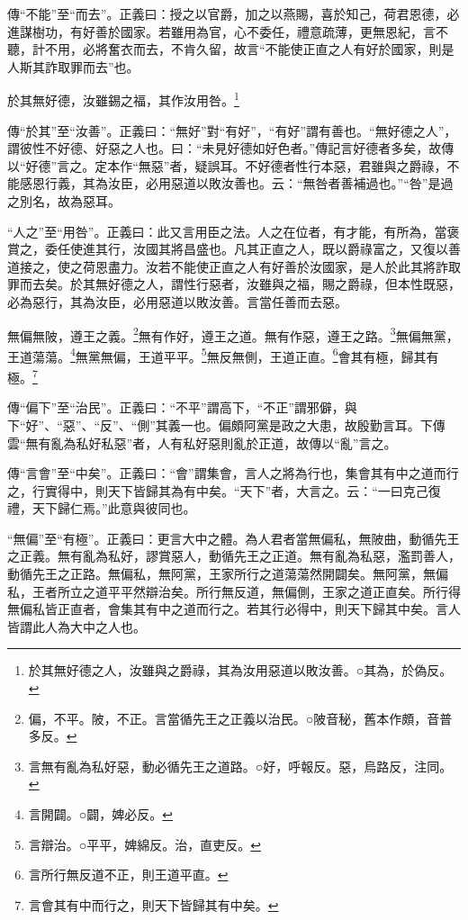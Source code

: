 {\noindent\zhuan{}\fzbyks 傳“不能”至“而去”。正義曰：授之以官爵，加之以燕賜，喜於知己，荷君恩德，必進謀樹功，有好善於國家。若雖用為官，心不委任，禮意疏薄，更無恩紀，言不聽，計不用，必將奮衣而去，不肯久留，故言“不能使正直之人有好於國家，則是人斯其詐取罪而去”也。 \par}

於其無好德，汝雖錫之福，其作汝用咎。\footnote{於其無好德之人，汝雖與之爵祿，其為汝用惡道以敗汝善。○其為，於偽反。}

{\noindent\zhuan{}\fzbyks 傳“於其”至“汝善”。正義曰：“無好”對“有好”，“有好”謂有善也。“無好德之人”，謂彼性不好德、好惡之人也。曰：“未見好德如好色者。”傳記言好德者多矣，故傳以“好德”言之。定本作“無惡”者，疑誤耳。不好德者性行本惡，君雖與之爵祿，不能感恩行義，其為汝臣，必用惡道以敗汝善也。云：“無咎者善補過也。”“咎”是過之別名，故為惡耳。 \par}

{\noindent\shu{}\fzkt “人之”至“用咎”。正義曰：此又言用臣之法。人之在位者，有才能，有所為，當褒賞之，委任使進其行，汝國其將昌盛也。凡其正直之人，既以爵祿富之，又復以善道接之，使之荷恩盡力。汝若不能使正直之人有好善於汝國家，是人於此其將詐取罪而去矣。於其無好德之人，謂性行惡者，汝雖與之福，賜之爵祿，但本性既惡，必為惡行，其為汝臣，必用惡道以敗汝善。言當任善而去惡。 \par}

無偏無陂，遵王之義。\footnote{偏，不平。陂，不正。言當循先王之正義以治民。○陂音秘，舊本作頗，音普多反。}無有作好，遵王之道。無有作惡，遵王之路。\footnote{言無有亂為私好惡，動必循先王之道路。○好，呼報反。惡，烏路反，注同。}無偏無黨，王道蕩蕩。\footnote{言開闢。○闢，婢必反。}無黨無偏，王道平平。\footnote{言辯治。○平平，婢綿反。治，直吏反。}無反無側，王道正直。\footnote{言所行無反道不正，則王道平直。}會其有極，歸其有極。\footnote{言會其有中而行之，則天下皆歸其有中矣。}


{\noindent\zhuan{}\fzbyks 傳“偏下”至“治民”。正義曰：“不平”謂高下，“不正”謂邪僻，與下“好”、“惡”、“反”、“側”其義一也。偏頗阿黨是政之大患，故殷勤言耳。下傳雲“無有亂為私好私惡”者，人有私好惡則亂於正道，故傳以“亂”言之。 \par}

{\noindent\zhuan{}\fzbyks 傳“言會”至“中矣”。正義曰：“會”謂集會，言人之將為行也，集會其有中之道而行之，行實得中，則天下皆歸其為有中矣。“天下”者，大言之。云：“一曰克己復禮，天下歸仁焉。”此意與彼同也。 \par}

{\noindent\shu{}\fzkt “無偏”至“有極”。正義曰：更言大中之體。為人君者當無偏私，無陂曲，動循先王之正義。無有亂為私好，謬賞惡人，動循先王之正道。無有亂為私惡，濫罰善人，動循先王之正路。無偏私，無阿黨，王家所行之道蕩蕩然開闢矣。無阿黨，無偏私，王者所立之道平平然辯治矣。所行無反道，無偏側，王家之道正直矣。所行得無偏私皆正直者，會集其有中之道而行之。若其行必得中，則天下歸其中矣。言人皆謂此人為大中之人也。 \par}

